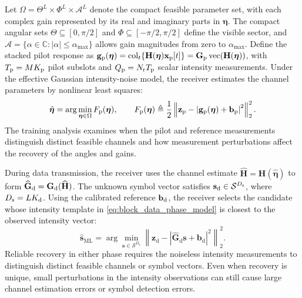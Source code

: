 \documentclass[journal]{IEEEtran}
\begin{document}
Let $\Omega=\Theta^L\times\Phi^L\times\mathcal A^L$ denote the compact
feasible parameter set, with each complex gain represented by its real and
imaginary parts in $\boldsymbol{\eta}$. The compact angular sets
$\Theta\subseteq[0,\pi/2]$ and $\Phi\subseteq[-\pi/2,\pi/2]$ define the visible
sector, and $\mathcal A=\{\alpha\in\mathbb C:|\alpha|\leq\alpha_{\max}\}$
allows gain magnitudes from zero to $\alpha_{\max}$. Define the stacked
pilot response as
$\mathbf g_{\rm p}(\boldsymbol{\eta})
=\operatorname{col}_t\{\mathbf H(\boldsymbol{\eta})\mathbf x_{\rm p}[t]\}
=\mathbf G_{\rm p}\operatorname{vec}(\mathbf H(\boldsymbol{\eta}))$,
with $T_{\rm p}=MK_{\rm p}$ pilot subslots and $Q_{\rm p}=N_{\rm r}T_{\rm p}$ scalar intensity
measurements. Under the effective Gaussian intensity-noise model, the receiver estimates the channel
parameters by nonlinear least squares:
\begin{equation}
\hat{\boldsymbol{\eta}}
=\arg\min_{\boldsymbol{\eta}\in\Omega}
F_{\rm p}(\boldsymbol{\eta}),\qquad
F_{\rm p}(\boldsymbol{\eta})\triangleq
\frac{1}{2}
\left\|
\mathbf{z}_{\rm p}
-\left|\mathbf{g}_{\rm p}(\boldsymbol{\eta})
+\mathbf{b}_{\rm p}\right|^{2}
\right\|_{2}^{2}.
\label{eq:joint_doa_channel_objective}
\end{equation}
The training analysis examines when the pilot and reference measurements
distinguish distinct feasible channels and how measurement perturbations
affect the recovery of the angles and gains.

During data transmission, the receiver uses the channel estimate
$\widehat{\mathbf{H}}=\mathbf{H}(\widehat{\boldsymbol{\eta}})$ to form
$\widehat{\mathbf{G}}_{\rm d}=\mathbf{G}_{\rm d}(\widehat{\mathbf{H}})$.
The unknown symbol vector satisfies
$\mathbf{s}_{\rm d}\in\mathcal{S}^{D_{\rm s}}$, where $D_{\rm s}=LK_{\rm d}$.
Using the calibrated reference $\mathbf{b}_{\rm d}$, the receiver selects
the candidate whose intensity template in \eqref{eq:block_data_phase_model}
is closest to the observed intensity vector:
\begin{equation}
\hat{\mathbf{s}}_{\mathrm{ML}}
=\arg\min_{\mathbf{s}\in\mathcal{S}^{D_{\mathrm{s}}}}
\left\|
\mathbf{z}_{\mathrm{d}}
-\left|\widehat{\mathbf{G}}_{\mathrm{d}}\mathbf{s}
+\mathbf{b}_{\mathrm{d}}\right|^{2}
\right\|_{2}^{2}.
\label{eq:ml_detector_rewritten}
\end{equation}
Reliable recovery in either phase requires the noiseless intensity
measurements to distinguish distinct feasible channels or symbol vectors.
Even when recovery is unique, small perturbations in the intensity
observations can still cause large channel estimation errors or symbol
detection errors.
\end{document}
